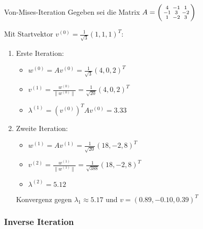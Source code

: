 \begin{example2}{Von-Mises-Iteration}
Gegeben sei die Matrix
$A = \begin{psmallmatrix} 
4 & -1 & 1 \\
-1 & 3 & -2 \\
1 & -2 & 3
\end{psmallmatrix}$

Mit Startvektor $v^{(0)} = \frac{1}{\sqrt{3}}(1,1,1)^T$:
\vspace{1mm}\\
\begin{enumerate}
    \item Erste Iteration:
    \vspace{1mm}
    \begin{itemize}
        \item $w^{(0)} = Av^{(0)} = \frac{1}{\sqrt{3}}(4,0,2)^T$
        \vspace{1mm}
        \item $v^{(1)} = \frac{w^{(0)}}{\|w^{(0)}\|} = \frac{1}{\sqrt{20}}(4,0,2)^T$
        \vspace{1mm}
        \item $\lambda^{(1)} = (v^{(0)})^TAv^{(0)} = 3.33$
        \vspace{1mm}
    \end{itemize}

    \item Zweite Iteration:
    \vspace{1mm}
    \begin{itemize}
        \item $w^{(1)} = Av^{(1)} = \frac{1}{\sqrt{20}}(18,-2,8)^T$
        \vspace{1mm}
        \item $v^{(2)} = \frac{w^{(1)}}{\|w^{(1)}\|} = \frac{1}{\sqrt{388}}(18,-2,8)^T$
        \vspace{1mm}
        \item $\lambda^{(2)} = 5.12$
        \vspace{1mm}
    \end{itemize}

Konvergenz gegen $\lambda_1 \approx 5.17$ und $v = (0.89, -0.10, 0.39)^T$
\end{enumerate}
\end{example2}





\subsubsection{Inverse Iteration}

